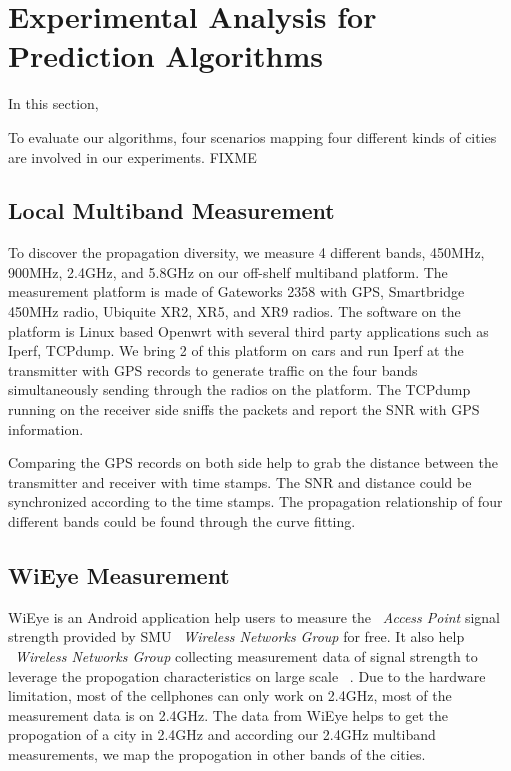 \section{Experimental Analysis for Prediction Algorithms}
\label{sec:experiment_design}
In this section, 

To evaluate our algorithms, four scenarios mapping four different kinds of cities are involved in our experiments. FIXME 

\subsection{Local Multiband Measurement}
To discover the propagation diversity, we measure 4 different bands, 450MHz, 900MHz, 2.4GHz, and 5.8GHz on our off-shelf multiband platform. 
The measurement platform is made of Gateworks 2358 with GPS, Smartbridge 450MHz radio, Ubiquite XR2, XR5, and XR9 radios. 
The software on the platform is Linux based Openwrt with several third party applications such as Iperf, TCPdump.
We bring 2 of this platform on cars and run Iperf at the transmitter with GPS records to generate traffic on the four bands simultaneously sending through the radios on the platform.
The TCPdump running on the receiver side sniffs the packets and report the SNR with GPS information.

Comparing the GPS records on both side help to grab the distance between the transmitter and receiver with time stamps. The SNR and distance could be synchronized according to the time stamps.
The propagation relationship of four different bands could be found through the curve fitting.
\subsection{WiEye Measurement}
WiEye is an Android application help users to measure the ~\emph{Access Point} signal strength provided by SMU ~\emph{Wireless Networks Group} for free. It also help ~\emph{Wireless Networks Group} collecting measurement data of signal strength to leverage the propogation characteristics on large scale ~\cite{meikle2012global}.
Due to the hardware limitation, most of the cellphones can only work on 2.4GHz, most of the measurement data is on 2.4GHz. 
The data from WiEye helps to get the propogation of a city in 2.4GHz and according our 2.4GHz multiband measurements, we map the propogation in other bands of the cities. 

